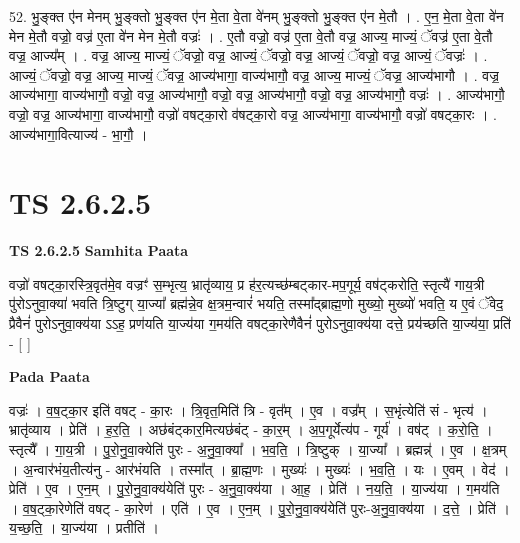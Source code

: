 \documentclass[17pt]{extarticle}
\begin{document}
52. भु॒ङ्क्त ए॑न मेनम् भु॒ङ्क्तो भु॒ङ्क्त ए॑न मे॒ता वे॒ता वे॑नम् भु॒ङ्क्तो भु॒ङ्क्त ए॑न मे॒तौ । . ए॒न॒ मे॒ता वे॒ता वे॑न मेन मे॒तौ वज्रो॒ वज्र॑ ए॒ता वे॑न मेन मे॒तौ वज्रः॑ । . ए॒तौ वज्रो॒ वज्र॑ ए॒ता वे॒तौ वज्र॒ आज्य॒ माज्यं॒ ॅवज्र॑ ए॒ता वे॒तौ वज्र॒ आज्य᳚म् । . वज्र॒ आज्य॒ माज्यं॒ ॅवज्रो॒ वज्र॒ आज्यं॒ ॅवज्रो॒ वज्र॒ आज्यं॒ ॅवज्रो॒ वज्र॒ आज्यं॒ ॅवज्रः॑ । . आज्यं॒ ॅवज्रो॒ वज्र॒ आज्य॒ माज्यं॒ ॅवज्र॒ आज्य॑भागा॒ वाज्य॑भागौ॒ वज्र॒ आज्य॒ माज्यं॒ ॅवज्र॒ आज्य॑भागौ । . वज्र॒ आज्य॑भागा॒ वाज्य॑भागौ॒ वज्रो॒ वज्र॒ आज्य॑भागौ॒ वज्रो॒ वज्र॒ आज्य॑भागौ॒ वज्रो॒ वज्र॒ आज्य॑भागौ॒ वज्रः॑ । . आज्य॑भागौ॒ वज्रो॒ वज्र॒ आज्य॑भागा॒ वाज्य॑भागौ॒ वज्रो॑ वषट्का॒रो व॑षट्का॒रो वज्र॒ आज्य॑भागा॒ वाज्य॑भागौ॒ वज्रो॑ वषट्का॒रः । . आज्य॑भागा॒वित्याज्य॑ - भा॒गौ॒ । \newline
\pagebreak
{}
\section*{ TS 2.6.2.5 }

\textbf{TS 2.6.2.5 } \newline
\textbf{Samhita Paata} \newline

वज्रो॑ वषट्का॒रस्त्रि॒वृत॑मे॒व वज्रꣳ॑ स॒म्भृत्य॒ भ्रातृ॑व्याय॒ प्र ह॑र॒त्यच्छ॑म्बट्कार-मप॒गूर्य॒ वष॑ट्करोति॒ स्तृत्यै॑ गाय॒त्री पु॑रोऽनुवा॒क्या॑ भवति त्रि॒ष्टुग् या॒ज्या᳚ ब्रह्म॑न्ने॒व क्ष॒त्रम॒न्वारं॑ भयति॒ तस्मा᳚द्ब्राह्म॒णो मुख्यो॒ मुख्यो॑ भवति॒ य ए॒वं ॅवेद॒ प्रैवैनं॑ पुरोऽनुवा॒क्य॑या ऽऽह॒ प्रण॑यति या॒ज्य॑या ग॒मय॑ति वषट्का॒रेणैवैनं॑ पुरोऽनुवा॒क्य॑या दत्ते॒ प्रय॑च्छति या॒ज्य॑या॒ प्रति॑ - [  ] \newline

\textbf{Pada Paata} \newline

वज्रः॑ । व॒ष॒ट्का॒र इति॑ वषट् - का॒रः । त्रि॒वृत॒मिति॑ त्रि - वृत᳚म् । ए॒व । वज्र᳚म् । स॒भृंत्येति॑ सं - भृत्य॑ । भ्रातृ॑व्याय । प्रेति॑ । ह॒र॒ति॒ । अछ॑बंट्कार॒मित्यछ॑बंट् - का॒र॒म् । अ॒प॒गूर्येत्य॑प - गूर्य॑ । वष॑ट् । क॒रो॒ति॒ । स्तृत्यै᳚ । गा॒य॒त्री । पु॒रो॒नु॒वा॒क्येति॑ पुरः - अ॒नु॒वा॒क्या᳚ । भ॒व॒ति॒ । त्रि॒ष्टुक् । या॒ज्या᳚ । ब्रह्मन्न्॑ । ए॒व । क्ष॒त्रम् । अ॒न्वार॑भंय॒तीत्य॑नु - आर॑भंयति । तस्मा᳚त् । ब्रा॒ह्म॒णः । मुख्यः॑ । मुख्यः॑ । भ॒व॒ति॒ । यः । ए॒वम् । वेद॑ । प्रेति॑ । ए॒व । ए॒न॒म् । पु॒रो॒नु॒वा॒क्य॑येति॑ पुरः - अ॒नु॒वा॒क्य॑या । आ॒ह॒ । प्रेति॑ । न॒य॒ति॒ । या॒ज्य॑या । ग॒मय॑ति । व॒ष॒ट्का॒रेणेति॑ वषट् - का॒रेण॑ । एति॑ । ए॒व । ए॒न॒म् । पु॒रो॒नु॒वा॒क्य॑येति॑ पुरः-अ॒नु॒वा॒क्य॑या । द॒त्ते॒ । प्रेति॑ । य॒च्छ॒ति॒ । या॒ज्य॑या । प्रतीति॑ ।  \newline
\end{document}
